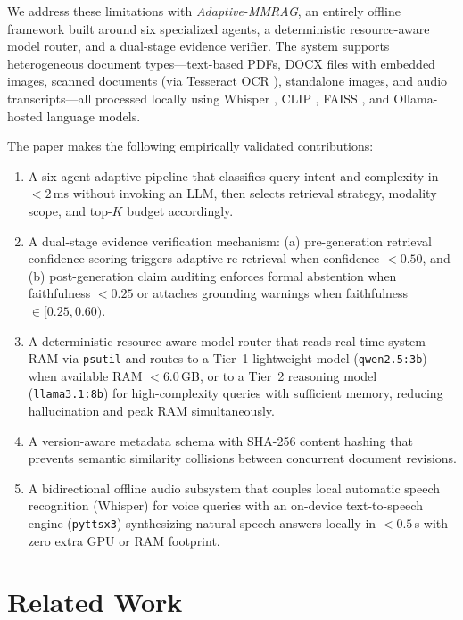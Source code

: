 \documentclass[conference]{IEEEtran}
\begin{document}
We address these limitations with \textit{Adaptive-MMRAG}, an entirely
offline framework built around six specialized agents, a deterministic
resource-aware model router, and a dual-stage evidence verifier. The system
supports heterogeneous document types—text-based PDFs, DOCX files with
embedded images, scanned documents (via Tesseract OCR \cite{smith2007tesseract}),
standalone images, and audio transcripts—all processed locally using
Whisper \cite{radford2023whisper}, CLIP \cite{radford2021clip},
FAISS \cite{johnson2019billion}, and Ollama-hosted language models.

The paper makes the following empirically validated contributions:
\begin{enumerate}
  \item A six-agent adaptive pipeline that classifies query intent and
        complexity in $<\!2$\,ms without invoking an LLM, then selects
        retrieval strategy, modality scope, and top-$K$ budget accordingly.
  \item A dual-stage evidence verification mechanism: (a) pre-generation
        retrieval confidence scoring triggers adaptive re-retrieval when
        confidence $<\!0.50$, and (b) post-generation claim auditing enforces
        formal abstention when faithfulness $<\!0.25$ or attaches grounding
        warnings when faithfulness $\in [0.25, 0.60)$.
  \item A deterministic resource-aware model router that reads real-time
        system RAM via \texttt{psutil} and routes to a Tier~1 lightweight
        model (\texttt{qwen2.5:3b}) when available RAM $<\!6.0$\,GB, or to a
        Tier~2 reasoning model (\texttt{llama3.1:8b}) for high-complexity
        queries with sufficient memory, reducing hallucination and peak RAM
        simultaneously.
  \item A version-aware metadata schema with SHA-256 content hashing that
        prevents semantic similarity collisions between concurrent document
        revisions.
  \item A bidirectional offline audio subsystem that couples local automatic
        speech recognition (Whisper) for voice queries with an on-device
        text-to-speech engine (\texttt{pyttsx3}) synthesizing natural speech
        answers locally in $<\!0.5$\,s with zero extra GPU or RAM footprint.
\end{enumerate}

\section{Related Work}\label{sec:related}
\end{document}

